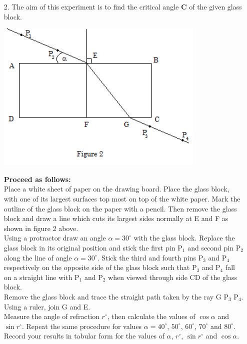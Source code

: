 \begin{enumerate}
\item[2.] The aim of this experiment is to find the critical angle \textbf{C} of the given glass block.

\begin{center}
\includegraphics[width=10cm]{./img/2005-2-alt.png}
\end{center}

\textbf{Proceed as follows:}\\[10pt]

Place a white sheet of paper on the drawing board. Place the glass block, with one of its largest surfaces top most on top of the white paper. Mark the outline of the glass block on the paper with a pencil. Then remove the glass block and draw a line which cuts its largest sides normally at E and F as shown in figure 2 above. \\[10pt]

Using a protractor draw an angle $\alpha = 30^\circ$ with the glass block. Replace the glass block in its original position and stick the first pin P$_1$ and second pin P$_2$ along the line of angle $\alpha = 30^\circ$. Stick the third and fourth pins P$_3$ and P$_4$ respectively on the opposite side of the glass block such that P$_3$ and P$_4$ fall on a straight line with P$_1$ and P$_2$ when viewed through side CD of the glass block. \\[10pt]

Remove the glass block and trace the straight path taken by the ray G P$_3$ P$_4$. Using a ruler, join G and E. \\[10pt]

Measure the angle of refraction $r^\circ$, then calculate the values of $\cos{\alpha}$ and $\sin{r^\circ}$. Repeat the same procedure for values $\alpha = 40^\circ$, $50^\circ$, $60^\circ$, $70^\circ$ and $80^\circ$. Record your results in tabular form for the values of $\alpha$, $r^\circ$, $\sin{r^\circ}$ and $\cos{\alpha}$.


\end{enumerate}
